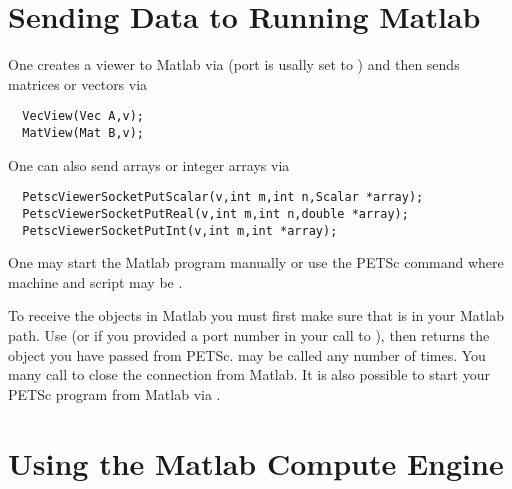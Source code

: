 \section{Sending Data to Running Matlab}

One creates a viewer to Matlab via 
(port is usally set to ) and then sends matrices or vectors via
\begin{verbatim}
  VecView(Vec A,v);
  MatView(Mat B,v);
\end{verbatim}
One can also send arrays or integer arrays via
\begin{verbatim}
  PetscViewerSocketPutScalar(v,int m,int n,Scalar *array);
  PetscViewerSocketPutReal(v,int m,int n,double *array);
  PetscViewerSocketPutInt(v,int m,int *array);
\end{verbatim}
One may start the Matlab program manually or use the PETSc command
 where machine and script may be .

To receive the objects in Matlab you must first make sure that 
is in your Matlab path. Use  (or  if you provided a port number in
your call to ), then  returns the object you have passed from PETSc.
 may be called any number of times. You many call  to close the connection from Matlab.
It is also possible to start your PETSc program from Matlab via .

\section{Using the Matlab Compute Engine}

